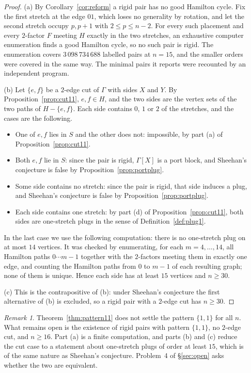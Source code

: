 \documentclass[11pt,a4paper]{article}
\theoremstyle{definition}
\theoremstyle{remark}
\newtheorem{remark}[theorem]{Remark}
\begin{document}
\begin{proof}
(a) By Corollary~\ref{cor:reform} a rigid pair has no good Hamilton cycle. Fix the first stretch at the edge $01$, which loses no generality by rotation, and let the second stretch occupy $p,p+1$ with $2\le p\le n-2$. For every such placement and every $2$-factor $F$ meeting $H$ exactly in the two stretches, an exhaustive computer enumeration finds a good Hamilton cycle, so no such pair is rigid. The enumeration covers $3\,098\,734\,688$ labelled pairs at $n=15$, and the smaller orders were covered in the same way. The minimal pairs it reports were recounted by an independent program.

(b) Let $\{e,f\}$ be a $2$-edge cut of $\Gamma$ with sides $X$ and $Y$. By Proposition~\ref{prop:cut11}, $e,f\in H$, and the two sides are the vertex sets of the two paths of $H-\{e,f\}$. Each side contains $0$, $1$ or $2$ of the stretches, and the cases are the following.
\begin{itemize}
\item One of $e,f$ lies in $S$ and the other does not: impossible, by part (a) of Proposition~\ref{prop:cut11}.
\item Both $e,f$ lie in $S$: since the pair is rigid, $\Gamma[X]$ is a port block, and Sheehan's conjecture is false by Proposition~\ref{prop:portplug}.
\item Some side contains no stretch: since the pair is rigid, that side induces a plug, and Sheehan's conjecture is false by Proposition~\ref{prop:portplug}.
\item Each side contains one stretch: by part (d) of Proposition~\ref{prop:cut11}, both sides are one-stretch plugs in the sense of Definition~\ref{def:plug1}.
\end{itemize}
In the last case we use the following computation: there is no one-stretch plug on at most $14$ vertices. It was checked by enumerating, for each $m=4,\dots,14$, all Hamilton paths $0\cdots m-1$ together with the $2$-factors meeting them in exactly one edge, and counting the Hamilton paths from $0$ to $m-1$ of each resulting graph; none of them is unique. Hence each side has at least $15$ vertices and $n\ge30$.

(c) This is the contrapositive of (b): under Sheehan's conjecture the first alternative of (b) is excluded, so a rigid pair with a $2$-edge cut has $n\ge30$.
\end{proof}

\begin{remark}
Theorem~\ref{thm:pattern11} does not settle the pattern $\{1,1\}$ for all $n$. What remains open is the existence of rigid pairs with pattern $\{1,1\}$, no $2$-edge cut, and $n\ge16$. Part (a) is a finite computation, and parts (b) and (c) reduce the cut case to a statement about one-stretch plugs of order at least $15$, which is of the same nature as Sheehan's conjecture. Problem~4 of \S\ref{sec:open} asks whether the two are equivalent.
\end{remark}
\end{document}
